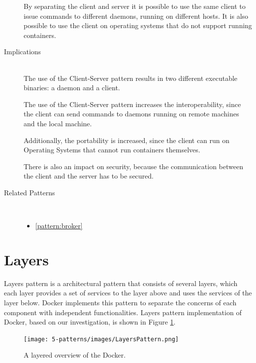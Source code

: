 \begin{description}

By separating the client and server it is possible to use the same client to issue commands to different daemons, running on different hosts.
It is also possible to use the client on operating systems that do not support running containers.

\item [Implications]~\\
The use of the {Client-Server} pattern results in two different executable binaries: a daemon and a client. 

The use of the {Client-Server} pattern increases the interoperability, since the client can send commands to daemons running on remote machines and the local machine.

Additionally, the portability is increased, since the client can run on Operating Systems that cannot run containers themselves.

There is also an impact on security, because the communication between the client and the server has to be secured.

\item [Related Patterns]~
\begin{itemize}
\item \ref{pattern:broker}
\end{itemize}

\end{description}

\section{Layers}
Layers pattern is a architectural pattern that consists of several layers, which
each layer provides a set of services to the layer above and uses the services
of the layer below. Docker implements this pattern to separate the concerns of
each component with independent functionalities. Layers pattern implementation
of Docker, based on our investigation, is shown in Figure \ref{fig:layers-pattern}.

\begin{figure}[H]
\centering
\texttt{[image: 5-patterns/images/LayersPattern.png]}
\caption{A layered overview of the Docker.}
\label{fig:layers-pattern}
\end{figure}

